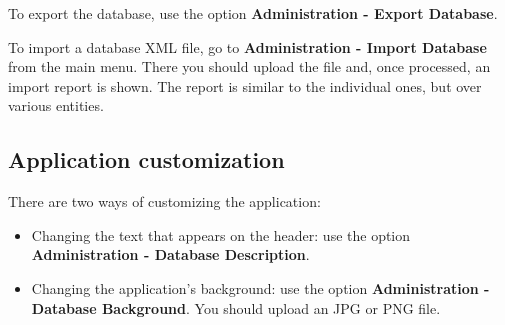 To export the database, use the option \textbf{Administration - Export Database}.

To import a database XML file, go to \textbf{Administration - Import Database} from
the main menu. There you should upload the file and, once processed, an import report
is shown. The report is similar to the individual ones, but over various entities.

\subsection{Application customization}

There are two ways of customizing the application:

\begin{itemize}
  \item Changing the text that appears on the header: use the option \textbf{Administration - Database Description}.
  \item Changing the application's background: use the option \textbf{Administration - Database Background}. You should upload an JPG or PNG file.
\end{itemize}
